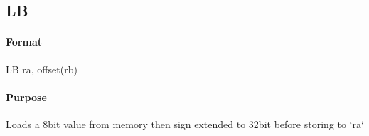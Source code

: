 \subsection{LB}


\paragraph{Format} LB ra, offset(rb)

\paragraph{Purpose} Loads a 8bit value from memory then sign extended to 32bit before storing to `ra`
